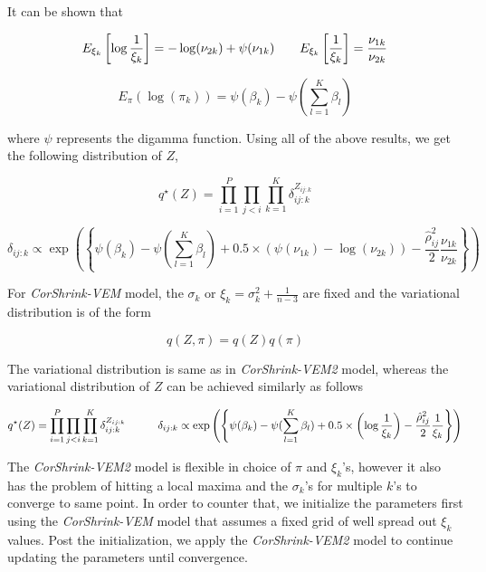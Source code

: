 It can be shown that 

\begin{equation}
E_{\xi_{k}} \left [ \log \frac{1}{\xi_{k}} \right]  = - \log (\nu_{2k}) + \psi(\nu_{1k})   \hspace{0.7 cm} E_{\xi_{k}} \left [ \frac{1}{\xi_{k}} \right ]  = \frac{\nu_{1k}}{\nu_{2k}} 
\end{equation}

\begin{equation} 
E_{\pi} \left (  \log (\pi_{k}) \right)  = \psi (\beta_{k}) - \psi (\sum_{l=1}^{K} \beta_{l} )
\end{equation}

where $\psi$ represents the digamma function. Using all of the above results, we get the following distribution of $Z$,

\begin{equation}
 q^{\star}(Z) = \prod_{i=1}^{P} \prod_{j < i} \prod_{k=1}^{K} \delta_{ij:k}^{Z_{ij:k}} 
 \end{equation}
 
\begin{equation}
\delta_{ij:k} \propto \exp \left (   \left \{ \psi (\beta_{k}) - \psi (\sum_{l=1}^{K} \beta_{l} ) + 0.5 \times ( \psi(\nu_{1k}) - \log (\nu_{2k}) ) -  \frac{\hat{\rho}^2_{ij}}{2} \frac{\nu_{1k}}{\nu_{2k}} \right \}  \right ) 
\end{equation}


For \textit{CorShrink-VEM} model, the $\sigma_{k}$ or $\xi_{k} = \sigma^2_{k} + \frac{1}{n-3}$ are fixed and the variational distribution is of the form 

\begin{equation}
q(Z, \pi) = q(Z) q(\pi) 
\end{equation}

The variational distribution is same as in \textit{CorShrink-VEM2} model, whereas the variational distribution of $Z$ can be achieved similarly as follows 

\begin{equation}
 q^{\star}(Z) = \prod_{i=1}^{P} \prod_{j < i} \prod_{k=1}^{K} \delta_{ij:k}^{Z_{ij:k}}
\hspace{0.4 in} \delta_{ij:k} \propto \exp \left (   \left \{ \psi (\beta_{k}) - \psi (\sum_{l=1}^{K} \beta_{l} ) + 0.5 \times \left ( \log \frac{1}{\xi_{k}} \right ) -  \frac{\hat{\rho}^2_{ij}}{2} \frac{1}{\xi_{k}} \right \}  \right ) 
\end{equation}

The \textit{CorShrink-VEM2} model is flexible in choice of $\pi$ and $\xi_{k}$'s, however it also has the problem of hitting a local maxima and the $\sigma_{k}$'s for multiple $k$'s to converge to same point. In order to counter that, we initialize the parameters first using the  \textit{CorShrink-VEM} model that assumes a fixed grid of well spread out $\xi_{k}$ values. 
Post the initialization, we apply the \textit{CorShrink-VEM2} model to continue updating the parameters until convergence. 

